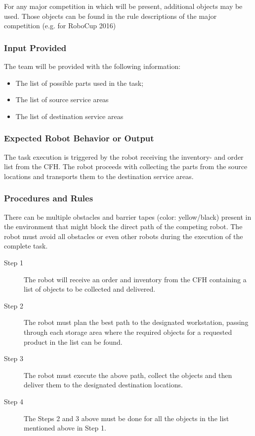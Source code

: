 For any major competition in which \erlir will be present, additional objects may be used.
Those objects can be found in the rule descriptions of the major competition (e.g. for RoboCup 2016)
\subsubsection{Input Provided}
\label{sssec:TaskFillaBoxInput}

The team will be provided with the following information:
%
\begin{itemize}
\item The list of possible parts used in the task;
\item The list of source service areas
\item The list of destination service areas
\end{itemize}

\subsubsection{Expected Robot Behavior or Output}
\label{sssec:TaskFillaBoxOutput}

The task execution is triggered by the robot receiving the inventory- and order list from the CFH.
The robot proceeds with collecting the parts from the source locations and transports them to the destination service areas.

\subsubsection{Procedures and Rules}
\label{sssec:TaskFillaBoxProcedures}

 There can be multiple obstacles and barrier tapes (color: yellow/black) present in the environment that might block the direct path of the competing robot. The robot must avoid all obstacles or even other robots during the execution of the complete task.
%
\begin{description}
\item[Step 1] The robot will receive an order and inventory from the CFH containing a list of objects to be collected and delivered.
\item[Step 2] The robot must plan the best path to the designated workstation, passing through each storage area where the required objects for a requested product in the list can be found. 
\item[Step 3] The robot must execute the above path, collect the objects and then deliver them to the designated destination locations.
\item[Step 4] The Steps 2 and 3 above must be done for all the objects in the list mentioned above in Step 1.
\end{description}

